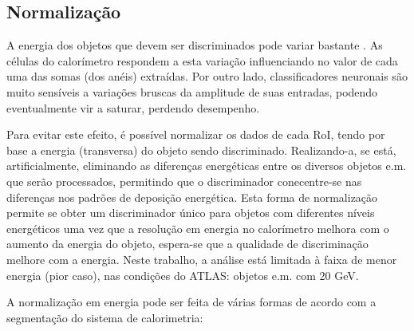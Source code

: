 \subsection{Normalização}
\label{sec:normal}

A energia dos objetos que devem ser discriminados pode variar bastante
\cite{hlt-tdr}. As células do calorímetro respondem a esta variação influenciando
no valor de cada uma das somas (dos anéis) extraídas. Por outro lado,
classificadores neuronais são muito sensíveis a variações bruscas da amplitude
de suas entradas, podendo eventualmente vir a saturar, perdendo desempenho.

Para evitar este efeito, é possível normalizar os dados de cada RoI, tendo por
base a energia (transversa) do objeto sendo discriminado. Realizando-a, se
está, artificialmente, eliminando as diferenças energéticas entre os diversos
objetos e.m. que serão processados, permitindo que o discriminador
conecentre-se nas diferenças nos padrões de deposição energética. Esta forma
de normalização permite se obter um discriminador único para objetos com
diferentes níveis energéticos uma vez que a resolução em energia no
calorímetro melhora com o aumento da energia do objeto, espera-se que a
qualidade de discriminação melhore com a energia. Neste trabalho, a análise
está limitada à faixa de menor energia (pior caso), nas condições do ATLAS:
objetos e.m. com 20 GeV.

A normalização em energia pode ser feita de várias formas de acordo com a
segmentação do sistema de calorimetria:

